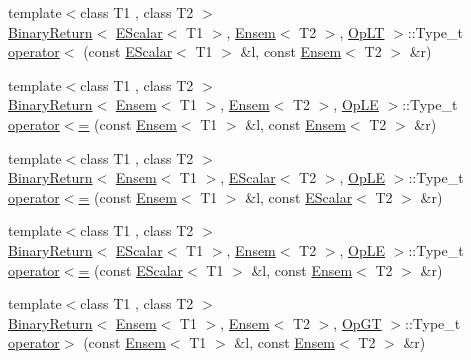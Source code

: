 \begin{DoxyCompactItemize}
\item 
{\footnotesize template$<$class T1 , class T2 $>$ }\\\mbox{\hyperlink{structENSEM_1_1BinaryReturn}{Binary\+Return}}$<$ \mbox{\hyperlink{classENSEM_1_1EScalar}{E\+Scalar}}$<$ T1 $>$, \mbox{\hyperlink{classENSEM_1_1Ensem}{Ensem}}$<$ T2 $>$, \mbox{\hyperlink{structENSEM_1_1OpLT}{Op\+LT}} $>$\+::Type\+\_\+t \mbox{\hyperlink{group__eensem_ga32b783bbc9759bd7ae2cbaa1f757f87d}{operator$<$}} (const \mbox{\hyperlink{classENSEM_1_1EScalar}{E\+Scalar}}$<$ T1 $>$ \&l, const \mbox{\hyperlink{classENSEM_1_1Ensem}{Ensem}}$<$ T2 $>$ \&r)
\item 
{\footnotesize template$<$class T1 , class T2 $>$ }\\\mbox{\hyperlink{structENSEM_1_1BinaryReturn}{Binary\+Return}}$<$ \mbox{\hyperlink{classENSEM_1_1Ensem}{Ensem}}$<$ T1 $>$, \mbox{\hyperlink{classENSEM_1_1Ensem}{Ensem}}$<$ T2 $>$, \mbox{\hyperlink{structENSEM_1_1OpLE}{Op\+LE}} $>$\+::Type\+\_\+t \mbox{\hyperlink{group__eensem_ga2a70dca80960fd84a701d582cced7d40}{operator$<$=}} (const \mbox{\hyperlink{classENSEM_1_1Ensem}{Ensem}}$<$ T1 $>$ \&l, const \mbox{\hyperlink{classENSEM_1_1Ensem}{Ensem}}$<$ T2 $>$ \&r)
\item 
{\footnotesize template$<$class T1 , class T2 $>$ }\\\mbox{\hyperlink{structENSEM_1_1BinaryReturn}{Binary\+Return}}$<$ \mbox{\hyperlink{classENSEM_1_1Ensem}{Ensem}}$<$ T1 $>$, \mbox{\hyperlink{classENSEM_1_1EScalar}{E\+Scalar}}$<$ T2 $>$, \mbox{\hyperlink{structENSEM_1_1OpLE}{Op\+LE}} $>$\+::Type\+\_\+t \mbox{\hyperlink{group__eensem_gaf74453e608d97ecc1e832a7b2a8fe3de}{operator$<$=}} (const \mbox{\hyperlink{classENSEM_1_1Ensem}{Ensem}}$<$ T1 $>$ \&l, const \mbox{\hyperlink{classENSEM_1_1EScalar}{E\+Scalar}}$<$ T2 $>$ \&r)
\item 
{\footnotesize template$<$class T1 , class T2 $>$ }\\\mbox{\hyperlink{structENSEM_1_1BinaryReturn}{Binary\+Return}}$<$ \mbox{\hyperlink{classENSEM_1_1EScalar}{E\+Scalar}}$<$ T1 $>$, \mbox{\hyperlink{classENSEM_1_1Ensem}{Ensem}}$<$ T2 $>$, \mbox{\hyperlink{structENSEM_1_1OpLE}{Op\+LE}} $>$\+::Type\+\_\+t \mbox{\hyperlink{group__eensem_ga876b949826dc1335f76b3b4e1c32b076}{operator$<$=}} (const \mbox{\hyperlink{classENSEM_1_1EScalar}{E\+Scalar}}$<$ T1 $>$ \&l, const \mbox{\hyperlink{classENSEM_1_1Ensem}{Ensem}}$<$ T2 $>$ \&r)
\item 
{\footnotesize template$<$class T1 , class T2 $>$ }\\\mbox{\hyperlink{structENSEM_1_1BinaryReturn}{Binary\+Return}}$<$ \mbox{\hyperlink{classENSEM_1_1Ensem}{Ensem}}$<$ T1 $>$, \mbox{\hyperlink{classENSEM_1_1Ensem}{Ensem}}$<$ T2 $>$, \mbox{\hyperlink{structENSEM_1_1OpGT}{Op\+GT}} $>$\+::Type\+\_\+t \mbox{\hyperlink{group__eensem_ga27f81ac9863b6ebd1af9a0927fd2c356}{operator$>$}} (const \mbox{\hyperlink{classENSEM_1_1Ensem}{Ensem}}$<$ T1 $>$ \&l, const \mbox{\hyperlink{classENSEM_1_1Ensem}{Ensem}}$<$ T2 $>$ \&r)

\end{DoxyCompactItemize}

